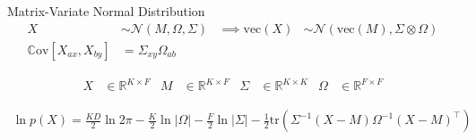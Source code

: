 \documentclass[xcolor=dvipsnames]{beamer}
\newcommand \vecf[1] {
    \text{vec}\left(#1\right)
}
\newcommand \halve[1] {
	\frac{#1}{2}
}
\newcommand \half {
    \halve{1}
}
\newcommand \tr { \text{tr} }
\newcommand \T { ^\top }
\newcommand \nor[2]   { \mathcal{N} \left( {#1}, {#2} \right) }
\newcommand \mnor[3]  { \mathcal{N} \left(#1, #2, #3\right) }
\newcommand \Tr[1]   { \tr \left(  {#1}  \right) }
\newcommand \MReal[2] { { \mathbb{R}^{#1 \times #2} } }
\newcommand \inv[1] { {#1}^{-1} }
\begin{document}

\begin{frame}{Matrix-Variate Normal Distribution}
\begin{align*}
X & \sim \mnor{M}{\Omega}{\Sigma} & \implies \vecf{X} & \sim \nor{\vecf{M}}{\Sigma \otimes \Omega} \\
\mathbb{C}\text{ov}\left[X_{ax}, X_{by}\right] & = \Sigma_{xy}\Omega_{ab}
\end{align*}


    {\small
        \begin{align*}
        X & \in \MReal{K}{F} &
        M & \in \MReal{K}{F} &
        \Sigma & \in \MReal{K}{K} &
        \Omega & \in \MReal{F}{F}
        \end{align*}
    }



    {\small
        \begin{align*}
        \ln p(X) = \frac{KD}{2}\ln 2\pi - \frac{K}{2}\ln |\Omega| - \frac{F}{2}\ln |\Sigma| -\half \Tr{\inv{\Sigma}(X - M)\inv{\Omega}(X - M)\T}
        \end{align*}
    }


\end{frame}



\end{document}
